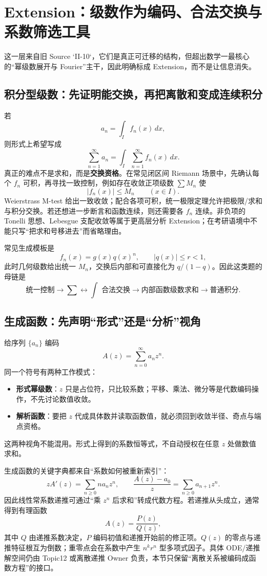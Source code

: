 \documentclass[11pt,a4paper,fontset=fandol]{ctexart}
\newcommand{\kw}[1]{\textbf{\color{deep}#1}}
\begin{document}
\section{Extension：级数作为编码、合法交换与系数筛选工具}

这一层来自旧 Source `II-10`，它们是真正可迁移的结构，但超出数学一最核心的“幂级数展开与 Fourier”主干，因此明确标成 Extension，而不是让信息消失。

\subsection{积分型级数：先证明能交换，再把离散和变成连续积分}
若
\[
a_n=\int_I f_n(x)\,dx,
\]
则形式上希望写成
\[
\sum_{n=1}^{\infty}a_n
=\int_I\sum_{n=1}^{\infty}f_n(x)\,dx.
\]
真正的难点不是求和，而是\textbf{交换资格}。在常见闭区间 Riemann 场景中，先确认每个 $f_n$ 可积，再寻找一致控制，例如存在收敛正项级数 $\sum M_n$ 使
\[
\lvert f_n(x)\rvert\le M_n\qquad(x\in I).
\]
Weierstrass M-test 给出一致收敛；配合各项可积，统一极限定理允许把极限/求和与积分交换。若还想进一步断言和函数连续，则还需要各 $f_n$ 连续。非负项的 Tonelli 思想、Lebesgue 支配收敛等属于更高层分析 Extension；在考研语境中不能只写“把求和号移进去”而省略理由。

常见生成模板是
\[
f_n(x)=g(x)q(x)^n,
\qquad \lvert q(x)\rvert\le r<1,
\]
此时几何级数给出统一 $M_n$，交换后内部和可直接化为 $q/(1-q)$。因此这类题的母链是
\[
\boxed{\text{统一控制}\to\sum\leftrightarrow\int\text{ 合法交换}\to\text{内部函数级数求和}\to\text{普通积分}}.
\]

\subsection{生成函数：先声明“形式”还是“分析”视角}
给序列 $\{a_n\}$ 编码
\[
A(z)=\sum_{n=0}^{\infty}a_nz^n.
\]
同一个符号有两种工作模式：
\begin{itemize}
  \item \kw{形式幂级数}：$z$ 只是占位符，只比较系数；平移、乘法、微分等是代数编码操作，不先讨论数值收敛。
  \item \kw{解析函数}：要把 $z$ 代成具体数并读取函数值，就必须回到收敛半径、奇点与端点资格。
\end{itemize}
这两种视角不能混用。形式上得到的系数恒等式，不自动授权在任意 $z$ 处做数值求和。

生成函数的关键字典都来自“系数如何被重新索引”：
\[
zA'(z)=\sum_{n\ge0}n a_nz^n,
\qquad
\frac{A(z)-a_0}{z}=\sum_{n\ge0}a_{n+1}z^n.
\]
因此线性常系数递推可通过“乘 $z^n$ 后求和”转成代数方程。若递推从头成立，通常得到有理函数
\[
A(z)=\frac{P(z)}{Q(z)},
\]
其中 $Q$ 由递推系数决定，$P$ 编码初值和递推开始前的修正项。$Q(z)$ 的零点与递推特征根互为倒数；重零点会在系数中产生 $n^k r^n$ 型多项式因子。具体 ODE/递推解空间仍由 Topic12 或离散递推 Owner 负责，本节只保留“离散关系被编码成函数方程”的接口。
\end{document}
